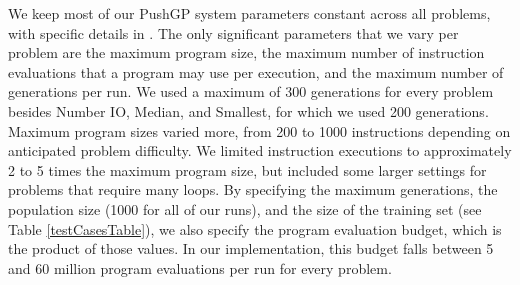 \documentclass{sig-alternate}
\begin{document}

We keep most of our PushGP system parameters constant across all problems, with specific details in \cite{helmuth:umass:tr}. The only significant parameters that we vary per problem are the maximum program size, the maximum number of instruction evaluations that a program may use per execution, and the maximum number of generations per run. We used a maximum of 300 generations for every problem besides Number IO, Median, and Smallest, for which we used 200 generations. Maximum program sizes varied more, from 200 to 1000 instructions depending on anticipated problem difficulty. We limited instruction executions to approximately 2 to 5 times the maximum program size, but included some larger settings for problems that require many loops.
By specifying the maximum generations, the population size (1000 for all of our runs), and the size of the training set (see Table \ref{testCasesTable}), we also specify the program evaluation budget, which is the product of those values. In our implementation, this budget falls between 5 and 60 million program evaluations per run for every problem. 
\end{document}
